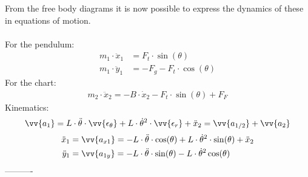 %
%
%
%
%
From the free body diagrams it is now possible to express the dynamics of these in equations of motion. \\\\
For the pendulum:
\begin{align}
m_1 \cdot \ddot x_1 &= F_t \cdot \sin(\theta) \label{eom1}\\
m_1 \cdot \ddot y_1 &= -F_g -F_t \cdot \cos(\theta) \label{eom2}
\end{align}
For the chart:
\begin{align}
m_2 \cdot \ddot x_2 = -B\cdot \dot x_2 - F_t \cdot \sin(\theta)+F_F \label{eom3}
\end{align}
Kinematics:
\begin{align}
\vv{a_1} = L\cdot \ddot \theta\cdot \vv{\epsilon_\theta} + L \cdot \dot \theta ^2 \cdot \vv{\epsilon_r} + \ddot x_2 = \vv{a_{1/2}}+\vv{a_2} \label{eom4}
\end{align}
\begin{align}
\ddot x_1&=\vv{a_{x1}}= -L \cdot \ddot\theta\cdot \cos(\theta) + L \cdot \dot \theta^2 \cdot \sin(\theta)+\ddot x_2  \label{eom5} \\
\ddot y_1&=\vv{a_{1y}}=-L\cdot \ddot\theta\cdot\sin(\theta) - L \cdot \dot \theta^2 \cos(\theta)\label{eom6}
\end{align}
----------\\

